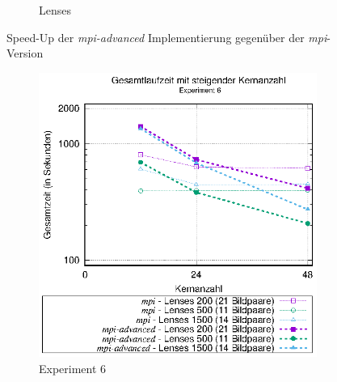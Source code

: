\begin{center}
\begin{figure}[h]
\begin{subfigure}[b]{0.45\textwidth}
			\caption{Lenses}
			\label{fig:mpi_advanced_speedup_lenses}
		\end{subfigure}
		\caption{Speed-Up der \textit{mpi-advanced} Implementierung gegenüber der \textit{mpi}-Version}
		\label{fig:mpi_advanced_speedup}
	\end{figure}
\end{center}

\begin{center}
	\begin{figure}[h]
		\begin{subfigure}[b]{0.45\textwidth}
			\centering
			\includegraphics[width=\textwidth]{pdf/mpi_advanced_times_exp6}
			\caption{Experiment 6}
			\label{fig:mpi_advanced_times_exp6}
		\end{subfigure}
		\hfill
		\begin{subfigure}[b]{0.45\textwidth}
			\centering

\end{subfigure}
\end{figure}
\end{center}

